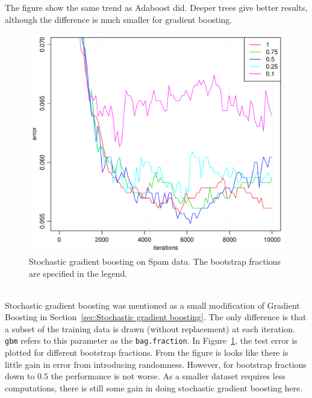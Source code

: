 The figure show the same trend as Adaboost did. Deeper trees give better results, although the difference is much smaller for gradient boosting.
\\
%
\begin{figure}[htbp]
\begin{center}
    \includegraphics[scale=0.5]{./figures/gradboostSpamStoch.pdf}
\end{center}
\caption{Stochastic gradient boosting on Spam data. The bootstrap fractions are specified in the legend.}
\label{fig:StochasticGradBoost}
\end{figure}
\\
Stochastic gradient boosting was mentioned as a small modification of Gradient Boosting in Section~\ref{sec:Stochastic gradient boosting}. The only difference is that a subset of the training data is drawn (without replacement) at each iteration. \verb+gbm+ refers to this parameter as the \verb+bag.fraction+. In Figure~\ref{fig:StochasticGradBoost}, the test error is plotted for different bootstrap fractions. From the figure is looks like there is little gain in error from introducing randomness. However, for bootstrap fractions down to $0.5$ the performance is not worse. As a smaller dataset requires less computations, there is still some gain in doing stochastic gradient boosting here.

